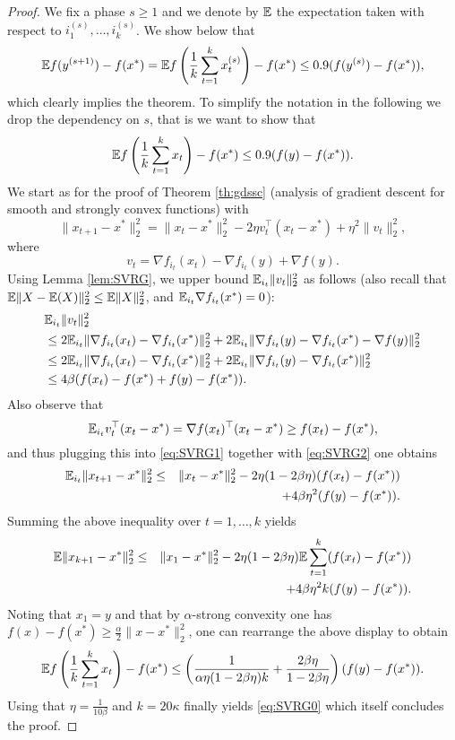 \begin{proof}
We fix a phase $s \geq 1$ and we denote by $\mathbb{E}$ the expectation taken with respect to $i_1^{(s)}, \hdots, i_k^{(s)}$. We show below that
$$\mathbb{E} f(y^{(s+1)}) - f(x^*) =  \mathbb{E} f\left(\frac1{k} \sum_{t=1}^k x_t^{(s)}\right) - f(x^*)  \leq 0.9 (f(y^{(s)}) - f(x^*)) ,$$
which clearly implies the theorem. To simplify the notation in the following we drop the dependency on $s$, that is we want to show that
\begin{equation} \label{eq:SVRG0}
\mathbb{E} f\left(\frac1{k} \sum_{t=1}^k x_t\right) - f(x^*)  \leq 0.9 (f(y) - f(x^*)) .
\end{equation}
We start as for the proof of Theorem \ref{th:gdssc} (analysis of gradient descent for smooth and strongly convex functions) with
\begin{equation} \label{eq:SVRG1}
\|x_{t+1} - x^*\|_2^2 = \|x_t - x^*\|_2^2 - 2 \eta v_t^{\top}(x_t - x^*) + \eta^2 \|v_t\|_2^2 ,
\end{equation}
where
$$v_t = \nabla f_{i_t}(x_t) - \nabla f_{i_t} (y) + \nabla f(y) .$$
Using Lemma \ref{lem:SVRG}, we upper bound $\mathbb{E}_{i_t} \|v_t\|_2^2$ as follows (also recall that $\mathbb{E}\|X-\mathbb{E}(X)\|_2^2 \leq \mathbb{E}\|X\|_2^2$, and $\mathbb{E}_{i_t} \nabla f_{i_t}(x^*) = 0$):
\begin{align}
& \mathbb{E}_{i_t} \|v_t\|_2^2 \notag \\
& \leq 2 \mathbb{E}_{i_t} \|\nabla f_{i_t}(x_t) - \nabla f_{i_t}(x^*) \|_2^2 + 2 \mathbb{E}_{i_t} \|\nabla f_{i_t}(y) - \nabla f_{i_t}(x^*) - \nabla f(y) \|_2^2 \notag \\
& \leq 2 \mathbb{E}_{i_t} \|\nabla f_{i_t}(x_t) - \nabla f_{i_t}(x^*) \|_2^2 + 2 \mathbb{E}_{i_t} \|\nabla f_{i_t}(y) - \nabla f_{i_t}(x^*) \|_2^2 \notag \\
& \leq 4 \beta (f(x_t) - f(x^*) + f(y) - f(x^*)) . \label{eq:SVRG2}
\end{align}
Also observe that
$$\mathbb{E}_{i_t} v_t^{\top}(x_t - x^*) = \nabla f(x_t)^{\top} (x_t - x^*) \geq f(x_t) - f(x^*) ,$$
and thus plugging this into \eqref{eq:SVRG1} together with \eqref{eq:SVRG2} one obtains
\begin{eqnarray*}
\mathbb{E}_{i_t} \|x_{t+1} - x^*\|_2^2 & \leq & \|x_t - x^*\|_2^2 - 2 \eta (1 - 2 \beta \eta) (f(x_t) - f(x^*)) \\
& & + 4 \beta \eta^2 (f(y) - f(x^*)) .
\end{eqnarray*}
Summing the above inequality over $t=1, \hdots, k$ yields
\begin{eqnarray*} 
\mathbb{E} \|x_{k+1} - x^*\|_2^2 & \leq & \|x_1 - x^*\|_2^2 - 2 \eta (1 - 2 \beta \eta) \mathbb{E} \sum_{t=1}^k (f(x_t) - f(x^*)) \\
& & + 4 \beta \eta^2 k (f(y) - f(x^*)) .
\end{eqnarray*}
Noting that $x_1 = y$ and that by $\alpha$-strong convexity one has $f(x) - f(x^*) \geq \frac{\alpha}{2} \|x - x^*\|_2^2$, one can rearrange the above display to obtain
$$\mathbb{E} f\left(\frac1{k} \sum_{t=1}^k x_t\right) - f(x^*)  \leq \left(\frac{1}{\alpha \eta (1 - 2 \beta \eta) k} + \frac{2 \beta \eta}{1- 2\beta \eta} \right) (f(y) - f(x^*)) .$$
Using that $\eta = \frac{1}{10\beta}$ and $k = 20 \kappa$ finally yields \eqref{eq:SVRG0} which itself concludes the proof.
\end{proof}

